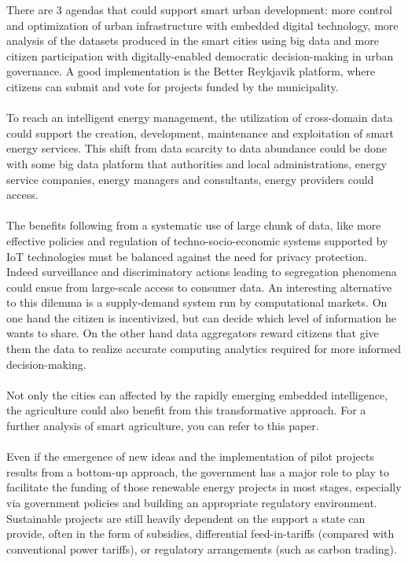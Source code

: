 \documentclass[11pt]{article}
\begin{document}
There are 3 agendas that could support smart urban development: more control and optimization of urban infrastructure with embedded digital technology, more analysis of the datasets produced in the smart cities using big data and more citizen participation with digitally-enabled democratic decision-making in urban governance. A good implementation is the Better Reykjavik platform, where citizens can submit and vote for projects funded by the municipality.\cite{14}\\\\
To reach an intelligent energy management, the utilization of cross-domain data could support the creation, development, maintenance and exploitation of smart energy services. This shift from data scarcity to data abundance could be done with some big data platform that authorities and local administrations, energy service companies, energy managers and consultants, energy providers could access.\cite{17}\cite{19}\\\\
The benefits following from a systematic use of large chunk of data, like more effective policies and regulation of techno-socio-economic systems supported by IoT technologies must be balanced against the need for privacy protection. Indeed surveillance and discriminatory actions leading to segregation phenomena could ensue from large-scale access to consumer data. An interesting alternative to this dilemma is a supply-demand system run by computational markets. On one hand the citizen is incentivized, but can decide which level of information he wants to share. On the other hand data aggregators reward citizens that give them the data to realize accurate computing analytics required for more informed decision-making.\cite{18}\\\\
Not only the cities can affected by the rapidly emerging embedded intelligence, the agriculture could also benefit from this transformative approach. For a further analysis of smart agriculture, you can refer to this paper\cite{16}.\\\\
Even if the emergence of new ideas and the implementation of pilot projects results from a bottom-up approach, the government has a major role to play to facilitate the funding of those renewable energy projects in most stages, especially via government policies and building an appropriate regulatory environment. Sustainable projects are still heavily dependent on the support a state can provide, often in the form of subsidies, differential feed-in-tariffs (compared with conventional power tariffs), or regulatory arrangements (such as carbon trading).\cite{22}\\
\end{document}
